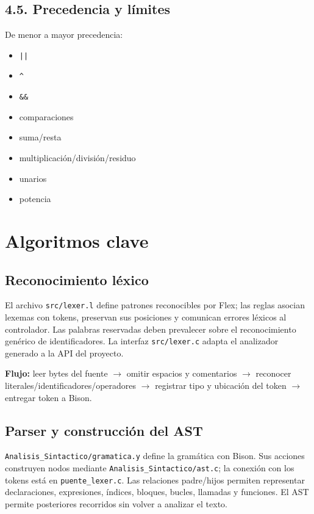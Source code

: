 \subsection{4.5. Precedencia y
límites}\label{45-precedencia-y-luxedmites}

De menor a mayor precedencia:
\begin{itemize}
    \item \texttt{||}
    \item \texttt{\textasciicircum}
    \item \texttt{\&\&}
    \item comparaciones
    \item suma/resta
    \item multiplicación/división/residuo
    \item unarios
    \item potencia
\end{itemize}

\section{Algoritmos clave}\label{5-algoritmos-clave--apartado-83}

\subsection{Reconocimiento
léxico}\label{51-reconocimiento-luxe9xico}

El archivo \texttt{src/lexer.l} define patrones
reconocibles por Flex; las reglas asocian lexemas con tokens, preservan
sus posiciones y comunican errores léxicos al controlador. Las palabras
reservadas deben prevalecer sobre el reconocimiento genérico de
identificadores. La interfaz \texttt{src/lexer.c}
adapta el analizador generado a la API del proyecto.

\textbf{Flujo:} leer bytes del fuente $\rightarrow$ omitir espacios y comentarios $\rightarrow$
reconocer literales/identificadores/operadores $\rightarrow$ registrar tipo y
ubicación del token $\rightarrow$ entregar token a Bison. 

\subsection{Parser y construcción del
AST}\label{52-parser-y-construcciuxf3n-del-ast}

\texttt{Analisis\_Sintactico/gramatica.y} define la
gramática con Bison. Sus acciones construyen nodos mediante
\texttt{Analisis\_Sintactico/ast.c}; la conexión con
los tokens está en \texttt{puente\_lexer.c}. Las
relaciones padre/hijos permiten representar declaraciones, expresiones,
índices, bloques, bucles, llamadas y funciones. El AST permite
posteriores recorridos sin volver a analizar el texto.


